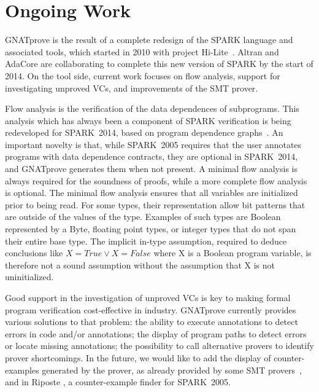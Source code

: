 \documentclass[sttt,final]{svjour}
\newcommand{\hilite}{Hi-Lite}
\newcommand{\gnatprove}{GNATprove\xspace}
\newcommand{\oldspark}{SPARK~2005\xspace}
\newcommand{\newspark}{SPARK~2014\xspace}
\begin{document}

\section{Ongoing Work}
\label{ongoing}

\gnatprove is the result of a complete redesign of the SPARK language and
associated tools, which started in 2010 with project \hilite\ \cite{Hi-Lite}.
Altran and AdaCore are collaborating to complete this new version of SPARK by
the start of 2014. On the tool side, current work focuses on flow analysis,
support for investigating unproved VCs, and improvements of the SMT prover.

Flow analysis is the verification of the data dependences of
subprograms. This analysis which has always been a component of SPARK
verification is being redeveloped for \newspark, based on program
dependence graphs~\cite{horwitz:1988:pldi}. An important novelty is
that, while \oldspark requires that the user annotates programs with
data dependence contracts, they are optional in \newspark, and
\gnatprove generates them when not present. A minimal flow analysis is
always required for the soundness of proofs, while a more complete
flow analysis is optional. The minimal flow analysis ensures that all
variables are initialized prior to being read. For some types, their
representation allow bit patterns that are outside of the values of
the type. Examples of such types are Boolean represented by a Byte,
floating point types, or integer types that do not span their entire
base type. The implicit in-type assumption, required to deduce
conclusions like $X = True \lor X = False$ where X is a Boolean
program variable, is therefore not a sound assumption without the
assumption that X is not uninitialized.

Good support in the investigation of unproved VCs is key to making
formal program verification cost-effective in industry. \gnatprove
currently provides various solutions to that problem: the ability to
execute annotations to detect errors in code and/or annotations; the
display of program paths to detect errors or locate missing
annotations; the possibility to call alternative provers to identify
prover shortcomings. In the future, we would like to add the display
of counter-examples generated by the prover, as already provided by
some SMT provers~\cite{CVC3,Z3model}, and in Riposte
\cite{riposteICLP}, a counter-example finder for \oldspark.
\end{document}
